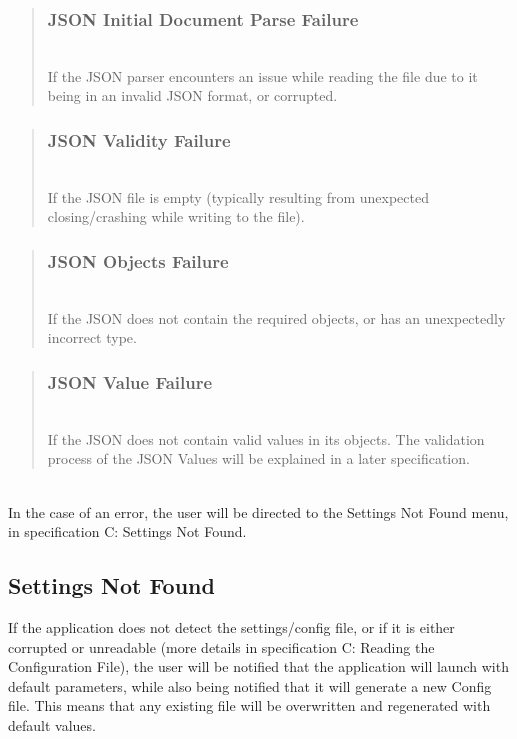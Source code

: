 \documentclass[conference]{IEEEtran}
\begin{document}
\begin{quote}
\subsubsection{JSON Initial Document Parse Failure}~\\
If the JSON parser encounters an issue while reading the file due to it being in an invalid JSON format, or corrupted.
\end{quote}

\begin{quote}
\subsubsection{JSON Validity Failure}~\\
If the JSON file is empty (typically resulting from unexpected closing/crashing while writing to the file).
\end{quote}

\begin{quote}
\subsubsection{JSON Objects Failure}~\\
If the JSON does not contain the required objects, or has an unexpectedly incorrect type.
\end{quote}

\begin{quote}
\subsubsection{JSON Value Failure}~\\
If the JSON does not contain valid values in its objects. The validation process of the JSON Values will be explained in a later specification.
\end{quote}~\\

In the case of an error, the user will be directed to the Settings Not Found menu, in specification C: Settings Not Found.~\\

\subsection{Settings Not Found}
If the application does not detect the settings/config file, or if it is either corrupted or unreadable (more details in specification C: Reading the Configuration File), the user will be notified that the application will launch with default parameters, while also being notified that it will generate a new Config file. This means that any existing file will be overwritten and regenerated with default values.~\\
\end{document}
